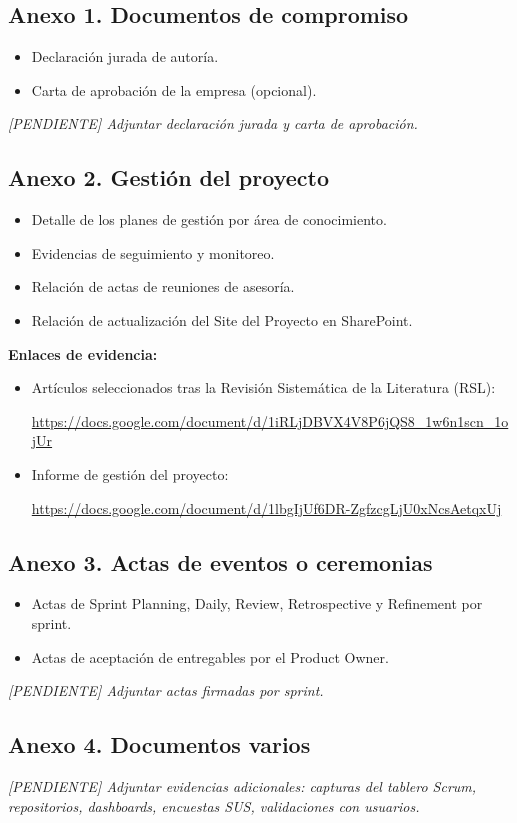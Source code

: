 \documentclass[12pt,a4paper,oneside]{report}
\newcommand{\pendiente}[1]{\textit{[PENDIENTE] #1}}
\begin{document}
\subsection*{Anexo 1. Documentos de compromiso}\label{anexo-1.-documentos-de-compromiso}

\begin{itemize}
\item
  Declaración jurada de autoría.
\item
  Carta de aprobación de la empresa (opcional).
\end{itemize}

\pendiente{Adjuntar declaración jurada y carta de aprobación.}

\subsection*{Anexo 2. Gestión del proyecto}\label{anexo-2.-gestiuxf3n-del-proyecto}

\begin{itemize}
\item
  Detalle de los planes de gestión por área de conocimiento.
\item
  Evidencias de seguimiento y monitoreo.
\item
  Relación de actas de reuniones de asesoría.
\item
  Relación de actualización del Site del Proyecto en SharePoint.
\end{itemize}

\textbf{Enlaces de evidencia:}

\begin{itemize}
\item
  Artículos seleccionados tras la Revisión Sistemática de la Literatura (RSL):

  \url{https://docs.google.com/document/d/1iRLjDBVX4V8P6jQS8_1w6n1scn_1ojUr}
\item
  Informe de gestión del proyecto:

  \url{https://docs.google.com/document/d/1lbgIjUf6DR-ZgfzcgLjU0xNcsAetqxUj}
\end{itemize}

\subsection*{Anexo 3. Actas de eventos o ceremonias}\label{anexo-3.-actas-de-eventos-o-ceremonias}

\begin{itemize}
\item
  Actas de Sprint Planning, Daily, Review, Retrospective y Refinement por sprint.
\item
  Actas de aceptación de entregables por el Product Owner.
\end{itemize}

\pendiente{Adjuntar actas firmadas por sprint.}

\subsection*{Anexo 4. Documentos varios}\label{anexo-4.-documentos-varios}

\pendiente{Adjuntar evidencias adicionales: capturas del tablero Scrum, repositorios, dashboards, encuestas SUS, validaciones con usuarios.}
\end{document}
